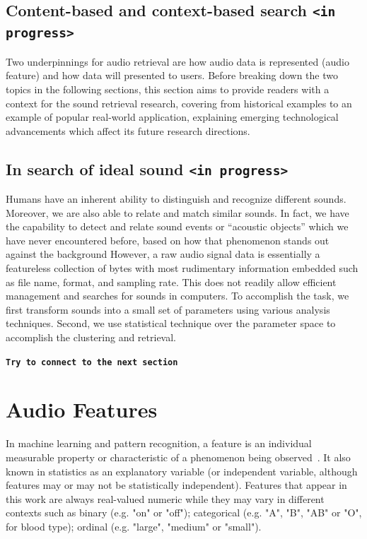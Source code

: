 \subsection{Content-based and context-based search \texttt{<in progress>}}

Two underpinnings for audio retrieval are how audio data is represented (audio feature) and how data will presented to users. Before breaking down the two topics in the following sections, this section aims to provide readers with a context for the sound retrieval research, covering from historical examples to an example of popular real-world application, explaining emerging technological advancements which affect its future research directions.

\subsection{In search of ideal sound \texttt{<in progress>}}
Humans have an inherent ability to distinguish and recognize different sounds. Moreover, we are also able to relate and match similar
sounds. In fact, we have the capability to detect and relate sound
events or “acoustic objects” which we have never encountered before, based on how that phenomenon stands out against the background 
However, a raw audio signal data is essentially a featureless collection of bytes with most rudimentary information embedded such as file name, format, and sampling rate. This does not readily allow efficient management and searches for sounds in computers. To accomplish the task, we first transform sounds into a small set of parameters using various analysis techniques. Second, we use statistical technique over the parameter space to accomplish the clustering and retrieval.

\texttt{\textbf{Try to connect to the next section}}

\section{Audio Features} 
In machine learning and pattern recognition, a feature is an individual measurable property or characteristic of a phenomenon being observed~\cite{bishop2006}. It also known in statistics as an explanatory variable (or independent variable, although features may or may not be statistically independent). Features that appear in this work are always real-valued numeric while they may vary in different contexts such as binary (e.g. "on" or "off"); categorical (e.g. "A", "B", "AB" or "O", for blood type); ordinal (e.g. "large", "medium" or "small").

